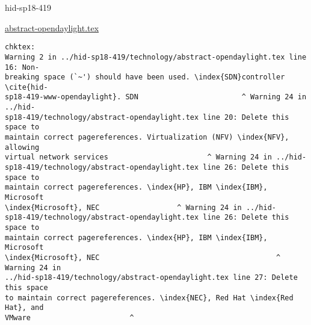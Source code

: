 \begin{IU}

hid-sp18-419

\href{https://github.com/cloudmesh-community/hid-sp18-419/blob/master//technology/abstract-opendaylight.tex}{abstract-opendaylight.tex}

\begin{tiny}
\begin{verbatim}
chktex:
Warning 2 in ../hid-sp18-419/technology/abstract-opendaylight.tex line 16: Non-
breaking space (`~') should have been used. \index{SDN}controller \cite{hid-
sp18-419-www-opendaylight}. SDN                        ^ Warning 24 in ../hid-
sp18-419/technology/abstract-opendaylight.tex line 20: Delete this space to
maintain correct pagereferences. Virtualization (NFV) \index{NFV}, allowing
virtual network services                       ^ Warning 24 in ../hid-
sp18-419/technology/abstract-opendaylight.tex line 26: Delete this space to
maintain correct pagereferences. \index{HP}, IBM \index{IBM}, Microsoft
\index{Microsoft}, NEC                  ^ Warning 24 in ../hid-
sp18-419/technology/abstract-opendaylight.tex line 26: Delete this space to
maintain correct pagereferences. \index{HP}, IBM \index{IBM}, Microsoft
\index{Microsoft}, NEC                                         ^ Warning 24 in
../hid-sp18-419/technology/abstract-opendaylight.tex line 27: Delete this space
to maintain correct pagereferences. \index{NEC}, Red Hat \index{Red Hat}, and
VMware                       ^
\end{verbatim}
\end{tiny}
\end{IU}



